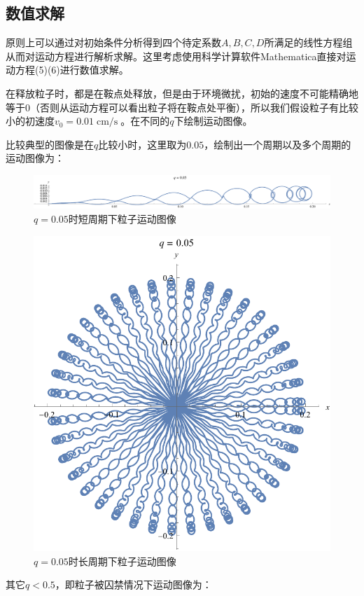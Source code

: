 \documentclass{WHUReport}
\begin{document}
\begin{multicols}{2}
	\subsection{数值求解}
	原则上可以通过对初始条件分析得到四个待定系数$A,B,C,D$所满足的线性方程组从而对运动方程进行解析求解。这里考虑使用科学计算软件Mathematica直接对运动方程(5)(6)进行数值求解。
	
	在释放粒子时，都是在鞍点处释放，但是由于环境微扰，初始的速度不可能精确地等于0（否则从运动方程可以看出粒子将在鞍点处平衡），所以我们假设粒子有比较小的初速度$v_0=0.01\operatorname{cm/s}$。在不同的$q$下绘制运动图像。
	
	比较典型的图像是在$q$比较小时，这里取为$0.05$，绘制出一个周期以及多个周期的运动图像为：
	\begin{figure}[H]
		\centering
		\includegraphics[width=\linewidth]{figures/0.05S.pdf}
		\caption{$q=0.05$时短周期下粒子运动图像}
	\end{figure}
	\begin{figure}[H]
		\centering
		\includegraphics[width=0.5\linewidth]{figures/0.05L.pdf}
		\caption{$q=0.05$时长周期下粒子运动图像}
	\end{figure}
	其它$q<0.5$，即粒子被囚禁情况下运动图像为：
	\begin{figure}[H]
		\centering  %
		\subfigbottomskip=2pt %
		\subfigcapskip=-5pt %

\end{figure}
\end{multicols}
\end{document}
